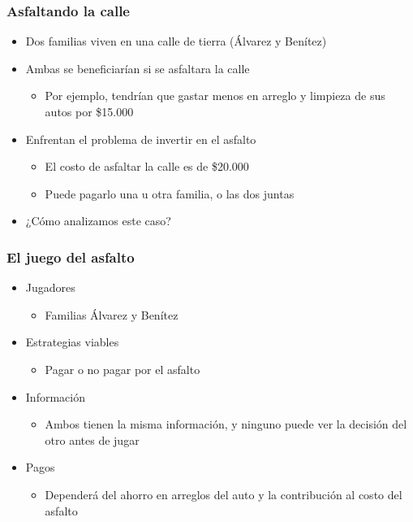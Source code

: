 \documentclass{beamer}
\begin{document}
\begin{frame}
\frametitle{Asfaltando la calle}
\begin{itemize}
    \item Dos familias viven en una calle de tierra (Álvarez y Benítez)
    \item Ambas se beneficiarían si se asfaltara la calle
        \begin{itemize}
        \item Por ejemplo, tendrían que gastar menos en arreglo y limpieza de sus autos por \$15.000
        \end{itemize}
    \item Enfrentan el problema de invertir en el asfalto
        \begin{itemize}
        \item El costo de asfaltar la calle es de \$20.000
        \item Puede pagarlo una u otra familia, o las dos juntas
        \end{itemize}
\item ¿Cómo analizamos este caso?
\end{itemize}
\end{frame}

\begin{frame}
\frametitle{ El juego del asfalto}
\begin{itemize}
    \item Jugadores
        \begin{itemize}
        \item Familias Álvarez y Benítez
        \end{itemize}
    \item Estrategias viables
        \begin{itemize}
        \item Pagar o no pagar por el asfalto
        \end{itemize}
    \item Información
        \begin{itemize}
        \item Ambos tienen la misma información, y ninguno puede ver la decisión del otro antes de jugar
        \end{itemize}
    \item Pagos
        \begin{itemize}
        \item Dependerá del ahorro en arreglos del auto y la contribución al costo del asfalto
        \end{itemize}
\end{itemize}
\end{frame}
\end{document}

